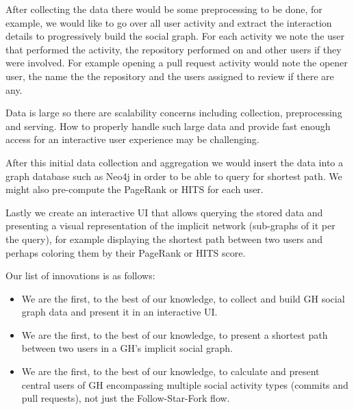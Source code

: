 \documentclass[sigconf,11pt]{acmart}
\begin{document}
After collecting the data there would be some preprocessing to be done, for example, we would like to go over all user
activity and extract the interaction details to progressively build the social graph.
For each activity we note the user that performed the activity, the repository performed on and other users if
they were involved.
For example opening a pull request activity would note the opener user, the name the the repository and the users
assigned to review if there are any.

Data is large so there are scalability concerns including collection, preprocessing and serving.
How to properly handle such large data and provide fast enough access for an interactive user experience may be challenging.

After this initial data collection and aggregation we would insert the data into a graph database such as Neo4j\cite{neo4j}
in order to be able to query for shortest path.
We might also pre-compute the PageRank\cite{pagerank} or HITS\cite{hits} for each user.

Lastly we create an interactive UI that allows querying the stored data and presenting a visual representation of the implicit
network (sub-graphs of it per the query), for example displaying the shortest path between two users and perhaps coloring
them by their PageRank or HITS score.

Our list of innovations is as follows:

\begin{itemize}
    \item We are the first, to the best of our knowledge, to collect and build GH social graph data and present it in an interactive UI.
    \item We are the first, to the best of our knowledge, to present a shortest path between two users in a GH's implicit social graph.
    \item We are the first, to the best of our knowledge, to calculate and present central users of GH
      encompassing multiple social activity types (commits and pull requests), not just the Follow-Star-Fork flow.
\end{itemize}



\end{document}
